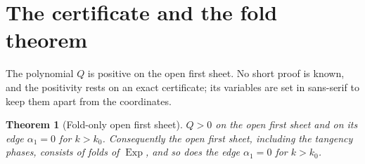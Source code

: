 \documentclass[11pt]{article}
\newtheorem{theorem}{Theorem}[section]
\theoremstyle{remark}
\newcommand{\Exp}{\operatorname{Exp}}
\begin{document}
\section{The certificate and the fold theorem}\label{sec:certificate}

The polynomial $Q$ is positive on the open first sheet.  No short proof is
known, and the positivity rests on an exact certificate; its variables are
set in sans-serif to keep them apart from the coordinates.

\begin{theorem}[Fold-only open first sheet]\label{thm:fold}
$Q>0$ on the open first sheet and on its edge $\alpha_1=0$ for $k>k_0$.  Consequently
the open first sheet, including the tangency phases, consists
of folds of $\Exp$, and so does the edge $\alpha_1=0$ for $k>k_0$.
\end{theorem}
\end{document}
